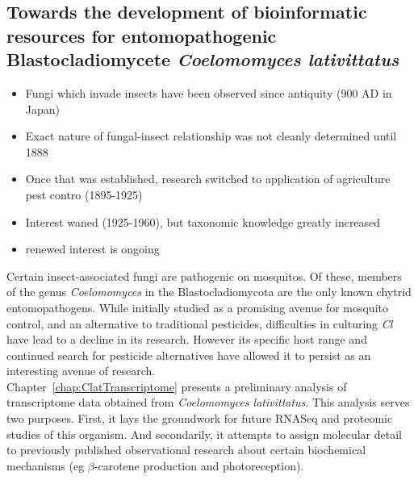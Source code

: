 \subsection*{Towards the development of bioinformatic resources for entomopathogenic Blastocladiomycete \textit{Coelomomyces lativittatus}}
\begin{itemize}
  \item Fungi which invade insects have been observed since antiquity (900 AD in Japan)\\
  \item Exact nature of fungal-insect relationship was not cleanly determined until 1888\\
  \item Once that was established, research switched to application of agriculture pest contro (1895-1925)\\
  \item Interest waned (1925-1960), but taxonomic knowledge greatly increased
  \item renewed interest is ongoing
\end{itemize}
\indent Certain insect-associated fungi are pathogenic on mosquitos. Of these, members of the genus \textit{Coelomomyces} in the Blastocladiomycota are the only known chytrid entomopathogens. While initially studied as a promising avenue for mosquito control, and an alternative to traditional pesticides, difficulties in culturing \textit{Cl} have lead to a decline in its research. However its specific host range and continued search for pesticide alternatives have allowed it to persist as an interesting avenue of research.\\
\indent Chapter~\ref{chap:ClatTranscriptome} presents a preliminary analysis of transcriptome data obtained from \textit{Coelomomyces lativittatus}. This analysis serves two purposes. First, it lays the groundwork for future RNASeq and proteomic studies of this organism. And secondarily, it attempts to assign molecular detail to previously published observational research about certain biochemical mechanisms (eg $\beta$-carotene production and photoreception).\\
